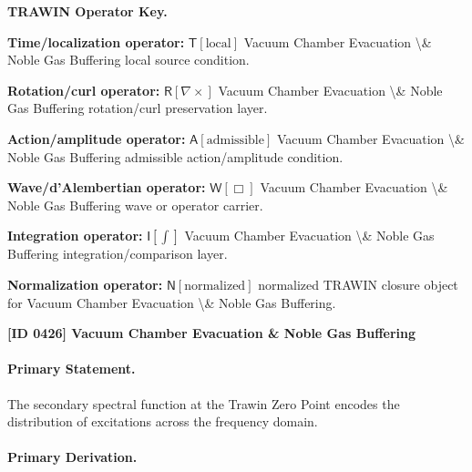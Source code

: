 \par\vspace{0.45\baselineskip}
\noindent\begin{minipage}[t]{\linewidth}
\begingroup
\small
\raggedright
\textbf{TRAWIN Operator Key.}\par
\noindent\textbf{Time/localization operator:} $\mathsf{T}\!\left[\mathrm{local}\right]$ Vacuum Chamber Evacuation \textbackslash{}\& Noble Gas Buffering local source condition.\par
\noindent\textbf{Rotation/curl operator:} $\mathsf{R}\!\left[\nabla\times\right]$ Vacuum Chamber Evacuation \textbackslash{}\& Noble Gas Buffering rotation/curl preservation layer.\par
\noindent\textbf{Action/amplitude operator:} $\mathsf{A}\!\left[\mathrm{admissible}\right]$ Vacuum Chamber Evacuation \textbackslash{}\& Noble Gas Buffering admissible action/amplitude condition.\par
\noindent\textbf{Wave/d'Alembertian operator:} $\mathsf{W}\!\left[\Box\right]$ Vacuum Chamber Evacuation \textbackslash{}\& Noble Gas Buffering wave or operator carrier.\par
\noindent\textbf{Integration operator:} $\mathsf{I}\!\left[\int\right]$ Vacuum Chamber Evacuation \textbackslash{}\& Noble Gas Buffering integration/comparison layer.\par
\noindent\textbf{Normalization operator:} $\mathsf{N}\!\left[\mathrm{normalized}\right]$ normalized TRAWIN closure object for Vacuum Chamber Evacuation \textbackslash{}\& Noble Gas Buffering.\par
\endgroup
\end{minipage}

\clearpage
\noindent\textbf{[ID 0426] Vacuum Chamber Evacuation \& Noble Gas Buffering}\par
\vspace{0.35em}
\paragraph{Primary Statement.}

The secondary spectral function at the Trawin Zero Point encodes the distribution of excitations across the frequency domain.

\paragraph{Primary Derivation.}

